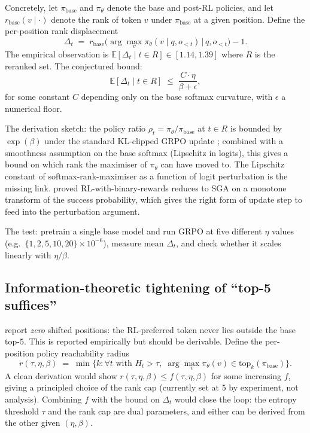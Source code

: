 \documentclass[11pt]{article}
\begin{document}
Concretely, let $\pi_{\text{base}}$ and $\pi_{\theta}$ denote the base and post-RL policies, and let $r_{\text{base}}(v \mid \cdot)$ denote the rank of token $v$ under $\pi_{\text{base}}$ at a given position. Define the per-position rank displacement
\begin{equation}
\Delta_t \;=\; r_{\text{base}}\!\big(\arg\max_v \pi_{\theta}(v \mid q, o_{<t}) \,\big|\, q, o_{<t}\big) - 1.
\label{eq:rank-disp}
\end{equation}
The empirical observation is $\mathbb{E}[\Delta_t \mid t \in R] \in [1.14, 1.39]$ where $R$ is the reranked set. The conjectured bound:
\begin{equation}
\mathbb{E}[\Delta_t \mid t \in R] \;\leq\; \frac{C \cdot \eta}{\beta + \epsilon},
\label{eq:lipschitz-bound}
\end{equation}
for some constant $C$ depending only on the base softmax curvature, with $\epsilon$ a numerical floor.

The derivation sketch: the policy ratio $\rho_t = \pi_\theta / \pi_{\text{base}}$ at $t \in R$ is bounded by $\exp(\beta)$ under the standard KL-clipped GRPO update \citep{shao2024grpo}; combined with a smoothness assumption on the base softmax (Lipschitz in logits), this gives a bound on which rank the maximiser of $\pi_\theta$ can have moved to. The Lipschitz constant of softmax-rank-maximiser as a function of logit perturbation is the missing link. \citet{davis2025objective} proved RL-with-binary-rewards reduces to SGA on a monotone transform of the success probability, which gives the right form of update step to feed into the perturbation argument.

The test: pretrain a single base model and run GRPO at five different $\eta$ values (e.g.\ $\{1, 2, 5, 10, 20\} \times 10^{-6}$), measure mean $\Delta_t$, and check whether it scales linearly with $\eta/\beta$.

\subsection*{Information-theoretic tightening of ``top-5 suffices''}

\citet{akgul2026} report \emph{zero} shifted positions: the RL-preferred token never lies outside the base top-$5$. This is reported empirically but should be derivable. Define the per-position policy reachability radius
\begin{equation}
r(\tau, \eta, \beta) \;=\; \min \{ k : \forall t \text{ with } H_t > \tau,\; \arg\max_v \pi_\theta(v) \in \mathrm{top}_k(\pi_{\text{base}}) \}.
\end{equation}
A clean derivation would show $r(\tau, \eta, \beta) \leq f(\tau, \eta, \beta)$ for some increasing $f$, giving a principled choice of the rank cap (currently set at $5$ by experiment, not analysis). Combining $f$ with the bound on $\Delta_t$ would close the loop: the entropy threshold $\tau$ and the rank cap are dual parameters, and either can be derived from the other given $(\eta, \beta)$.
\end{document}
